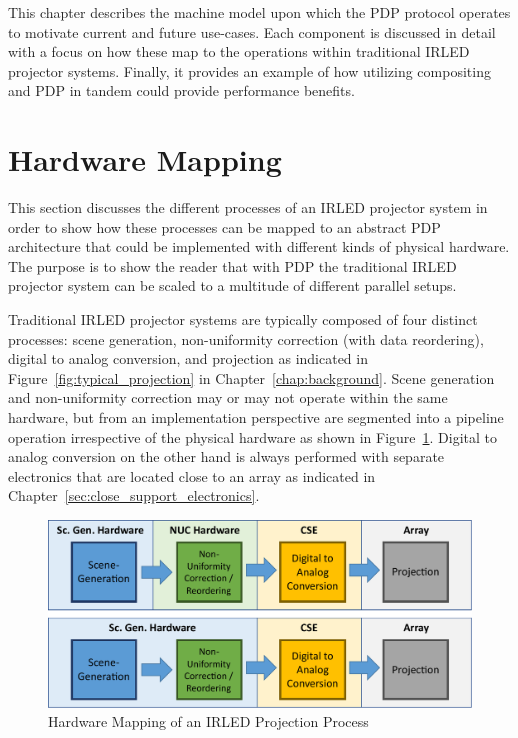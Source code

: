 \label{chap:machine_model}
This chapter describes the machine model upon which the PDP protocol operates to motivate current and future use-cases. Each component is discussed in detail with a focus on how these map to the operations within traditional IRLED projector systems. Finally, it provides an example of how utilizing compositing and PDP in tandem could provide performance benefits.

\section{Hardware Mapping}
    This section discusses the different processes of an IRLED projector system in order to show how these processes can be mapped to an abstract PDP architecture that could be implemented with different kinds of physical hardware. The purpose is to show the reader that with PDP the traditional IRLED projector system can be scaled to a multitude of different parallel setups.

    Traditional IRLED projector systems are typically composed of four distinct processes: scene generation, non-uniformity correction (with data reordering), digital to analog conversion, and projection as indicated in Figure~\ref{fig:typical_projection} in Chapter~\ref{chap:background}. Scene generation and non-uniformity correction may or may not operate within the same hardware, but from an implementation perspective are segmented into a pipeline operation irrespective of the physical hardware as shown in Figure~\ref{fig:typical_projection_hardware}. Digital to analog conversion on the other hand is always performed with separate electronics that are located close to an array as indicated in Chapter~\ref{sec:close_support_electronics}.

    \begin{figure}
        \centering
        \includegraphics[width=1.0\textwidth]{fig/typical_projection_system_hardware.pdf}
        \caption{Hardware Mapping of an IRLED Projection Process}
        \label{fig:typical_projection_hardware}
    \end{figure}

